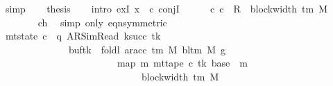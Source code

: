 \begin{isabellebody}
\ simp\isanewline
\ \ \isamarkupfalse%
\ {\isacharquery}{\kern0pt}thesis\isanewline
\ \ \isamarkupfalse%
\ {\isacharparenleft}{\kern0pt}intro\ exI{\isacharbrackleft}{\kern0pt}\ x\ {\isacharequal}{\kern0pt}\ c{}{\isacharbrackright}{\kern0pt}\ conjI{\isacharparenright}{\kern0pt}\isanewline
\ \ \ \ \isamarkupfalse%
\ {\isachardoublequoteopen}{\isacharparenleft}{\kern0pt}c{\isacharprime}{\kern0pt}{\isacharcomma}{\kern0pt}\ c{}{\isacharparenright}{\kern0pt}\ {\isasymin}\ R{\isacharprime}{\kern0pt}\ {\isacharcircum}{\kern0pt}{\isacharcircum}{\kern0pt}\ {\isacharparenleft}{\kern0pt}block{\isacharunderscore}{\kern0pt}width\ {\isacharparenleft}{\kern0pt}{\isasymGamma}{\isacharunderscore}{\kern0pt}tm\ M{\isacharparenright}{\kern0pt}\ {\isacharplus}{\kern0pt}\ {}{\isacharparenright}{\kern0pt}{\isachardoublequoteclose}\isanewline
\ \ \ \ \ \ \isamarkupfalse%
\ ch{}{}\ \isamarkupfalse%
\ {\isacharparenleft}{\kern0pt}simp\ only{\isacharcolon}{\kern0pt}\ eqn{\isacharbrackleft}{\kern0pt}symmetric{\isacharbrackright}{\kern0pt}{\isacharparenright}{\kern0pt}\isanewline
\ \ \ \ \isamarkupfalse%
\ {\isachardoublequoteopen}mt{\isacharunderscore}{\kern0pt}state\ c{}\ {\isacharequal}{\kern0pt}\ {\isacharparenleft}{\kern0pt}q{\isacharcomma}{\kern0pt}\ AR{\isacharunderscore}{\kern0pt}SimRead{\isacharcomma}{\kern0pt}\ k{\isacharunderscore}{\kern0pt}succ\ tk{\isacharcomma}{\kern0pt}\ {}{\isacharcomma}{\kern0pt}\isanewline
\ \ \ \ \ \ \ \ \ \ \ \ \ \ buf{\isacharparenleft}{\kern0pt}tk\ {\isacharcolon}{\kern0pt}{\isacharequal}{\kern0pt}\ foldl\ {\isacharparenleft}{\kern0pt}ar{\isacharunderscore}{\kern0pt}acc\ {\isacharparenleft}{\kern0pt}{\isasymGamma}{\isacharunderscore}{\kern0pt}tm\ M{\isacharparenright}{\kern0pt}\ {\isacharparenleft}{\kern0pt}bl{\isacharunderscore}{\kern0pt}tm\ M{\isacharparenright}{\kern0pt}{\isacharparenright}{\kern0pt}\ {\isacharquery}{\kern0pt}g{}\isanewline
\ \ \ \ \ \ \ \ \ \ \ \ \ \ \ \ \ \ \ \ \ \ \ \ {\isacharparenleft}{\kern0pt}map\ {\isacharparenleft}{\kern0pt}{\isasymlambda}m{\isachardot}{\kern0pt}\ mt{\isacharunderscore}{\kern0pt}tape\ c{\isacharprime}{\kern0pt}\ tk\ {\isacharparenleft}{\kern0pt}base\ {\isacharplus}{\kern0pt}\ m{\isacharparenright}{\kern0pt}{\isacharparenright}{\kern0pt}\isanewline
\ \ \ \ \ \ \ \ \ \ \ \ \ \ \ \ \ \ \ \ \ \ \ \ \ \ \ \ \ {\isacharbrackleft}{\kern0pt}{}{\isachardot}{\kern0pt}{\isachardot}{\kern0pt}{\isacharless}{\kern0pt}block{\isacharunderscore}{\kern0pt}width\ {\isacharparenleft}{\kern0pt}{\isasymGamma}{\isacharunderscore}{\kern0pt}tm\ M{\isacharparenright}{\kern0pt}{\isacharbrackright}{\kern0pt}{\isacharparenright}{\kern0pt}{\isacharparenright}{\kern0pt}{\isacharcomma}{\kern0pt}\isanewline

\end{isabellebody}

